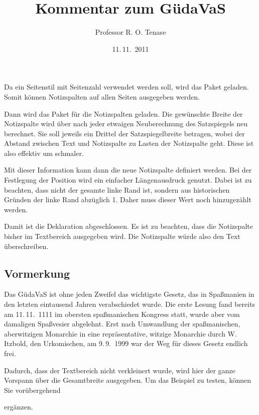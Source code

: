 \begin{Example}
  Da ein Seitenstil mit
  Seitenzahl verwendet werden soll, wird das Paket
  \hyperref[cha:scrlayer-scrpage]{}%
   geladen. Somit können Notizspalten auf allen
  Seiten ausgegeben werden.

  Dann wird das Paket  für die Notizspalten geladen. Die
  gewünschte Breite der Notizspalte wird über
   nach jeder etwaigen Neuberechnung des
  Satzspiegels%
   neu berechnet. Sie soll jeweils ein Drittel der
  Satzspiegelbreite betragen, wobei der Abstand zwischen Text und Notizspalte
  zu Lasten der Notizspalte geht. %
  \iftrue%
  Diese ist also effektiv um 
  schmaler.%
  \fi

  Mit dieser Information kann dann die neue Notizspalte definiert werden. Bei
  der Festlegung der Position wird ein einfacher Längenausdruck genutzt. Dabei
  ist zu beachten, dass  nicht der gesamte linke Rand
  ist, sondern aus historischen Gründen der linke Rand abzüglich
  1. Daher muss dieser Wert noch hinzugezählt werden.

  Damit ist die Deklaration abgeschlossen. Es ist zu beachten, dass die
  Notizspalte bisher im Textbereich ausgegeben wird. Die Notizspalte würde
  also den Text überschreiben.

\begin{lstcode}
  

  \title{Kommentar zum GüdaVaS}
  \author{Professor R. O. Tenase}
  \date{11.\,11.~2011}
  \maketitle
  \tableofcontents

  \section{Vormerkung}
  Das GüdaVaS ist ohne jeden Zweifel das wichtigste
  Gesetz, das in Spaßmanien in den letzten eintausend
  Jahren verabschiedet wurde. Die erste Lesung fand
  bereits am 11.\,11.~1111 im obersten spaßmanischen
  Kongress statt, wurde aber vom damaligen Spaßvesier
  abgelehnt. Erst nach Umwandlung der spaßmanischen,
  aberwitzigen Monarchie in eine repräsentative,
  witzige Monarchie durch W. Itzbold, 
  den Urkomischen, am 9.\,9.~1999 war der Weg für 
  dieses Gesetz endlich frei.
\end{lstcode}
Dadurch, dass der Textbereich nicht verkleinert wurde, wird
hier der ganze Vorspann über die Gesamtbreite ausgegeben. Um das Beispiel zu
testen, können Sie vorübergehend
\begin{lstcode}
  
\end{lstcode}
  ergänzen.
\end{Example}
